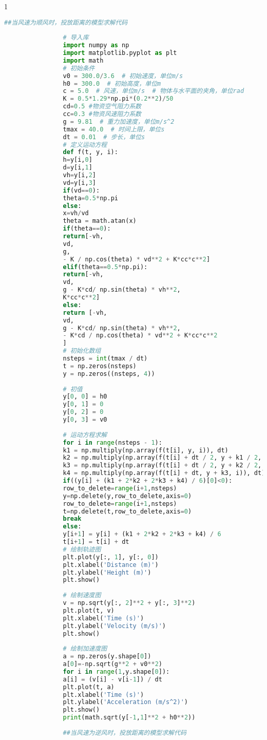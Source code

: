 \documentclass[normalsize]{ctexart}
\begin{document}
\begin{spacing}{1}
\begin{lstlisting}[language={Python}]
				##当风速为顺风时，投放距离的模型求解代码
				
				# 导入库
				import numpy as np
				import matplotlib.pyplot as plt
				import math
				# 初始条件
				v0 = 300.0/3.6  # 初始速度，单位m/s
				h0 = 300.0  # 初始高度，单位m
				c = 5.0  # 风速，单位m/s  # 物体与水平面的夹角，单位rad
				K = 0.5*1.29*np.pi*(0.2**2)/50
				cd=0.5 #物资空气阻力系数
				cc=0.3 #物资风速阻力系数
				g = 9.81  # 重力加速度，单位m/s^2
				tmax = 40.0  # 时间上限，单位s
				dt = 0.01  # 步长，单位s
				# 定义运动方程
				def f(t, y, i):
				h=y[i,0]
				d=y[i,1]
				vh=y[i,2]
				vd=y[i,3]
				if(vd==0):
				theta=0.5*np.pi
				else:
				x=vh/vd
				theta = math.atan(x)
				if(theta==0):
				return[-vh,
				vd,
				g,
				- K / np.cos(theta) * vd**2 + K*cc*c**2]
				elif(theta==0.5*np.pi):
				return[-vh,
				vd,
				g - K*cd/ np.sin(theta) * vh**2,
				K*cc*c**2]
				else:
				return [-vh,
				vd,
				g - K*cd/ np.sin(theta) * vh**2,
				- K*cd / np.cos(theta) * vd**2 + K*cc*c**2
				]
				# 初始化数组
				nsteps = int(tmax / dt)
				t = np.zeros(nsteps)
				y = np.zeros((nsteps, 4))
				
				# 初值
				y[0, 0] = h0
				y[0, 1] = 0 
				y[0, 2] = 0
				y[0, 3] = v0
				
				# 运动方程求解
				for i in range(nsteps - 1):
				k1 = np.multiply(np.array(f(t[i], y, i)), dt)
				k2 = np.multiply(np.array(f(t[i] + dt / 2, y + k1 / 2, i)), dt)
				k3 = np.multiply(np.array(f(t[i] + dt / 2, y + k2 / 2, i)), dt)
				k4 = np.multiply(np.array(f(t[i] + dt, y + k3, i)), dt)
				if((y[i] + (k1 + 2*k2 + 2*k3 + k4) / 6)[0]<0):
				row_to_delete=range(i+1,nsteps)
				y=np.delete(y,row_to_delete,axis=0)
				row_to_delete=range(i+1,nsteps)
				t=np.delete(t,row_to_delete,axis=0)
				break
				else:
				y[i+1] = y[i] + (k1 + 2*k2 + 2*k3 + k4) / 6
				t[i+1] = t[i] + dt
				# 绘制轨迹图
				plt.plot(y[:, 1], y[:, 0])
				plt.xlabel('Distance (m)')
				plt.ylabel('Height (m)')
				plt.show()
				
				# 绘制速度图
				v = np.sqrt(y[:, 2]**2 + y[:, 3]**2)
				plt.plot(t, v)
				plt.xlabel('Time (s)')
				plt.ylabel('Velocity (m/s)')
				plt.show()
				
				# 绘制加速度图
				a = np.zeros(y.shape[0])
				a[0]=-np.sqrt(g**2 + v0**2)
				for i in range(1,y.shape[0]):
				a[i] = (v[i] - v[i-1]) / dt
				plt.plot(t, a)
				plt.xlabel('Time (s)')
				plt.ylabel('Acceleration (m/s^2)')
				plt.show()
				print(math.sqrt(y[-1,1]**2 + h0**2))
				
				##当风速为逆风时，投放距离的模型求解代码
				

\end{lstlisting}
\end{spacing}
\end{document}
